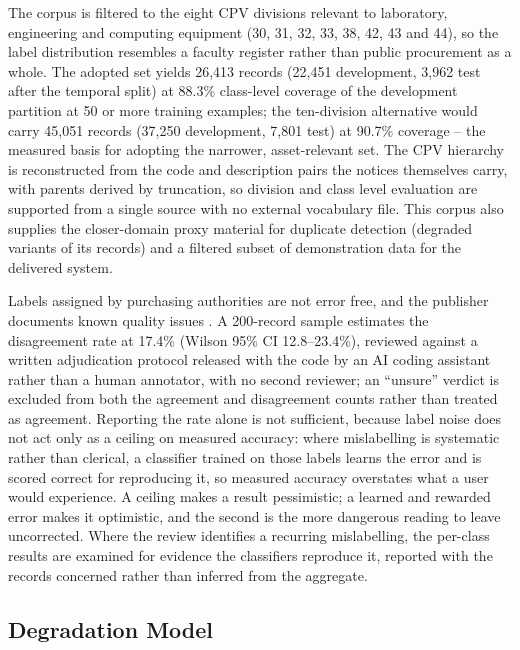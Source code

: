 \documentclass[conference]{IEEEtran}
\begin{document}
The corpus is filtered to the eight CPV divisions relevant to
laboratory, engineering and computing equipment (30, 31, 32, 33, 38,
42, 43 and 44), so the label distribution resembles a faculty register
rather than public procurement as a whole. The adopted set yields
26,413 records (22,451 development, 3,962 test after the temporal
split) at 88.3\% class-level coverage of the development partition at
50 or more training examples; the ten-division alternative would carry
45,051 records (37,250 development, 7,801 test) at 90.7\% coverage --
the measured basis for adopting the narrower, asset-relevant set. The
CPV hierarchy is reconstructed from the code and description pairs the
notices themselves carry, with parents derived by truncation, so
division and class level evaluation are supported from a single source
with no external vocabulary file. This corpus also supplies the
closer-domain proxy material for duplicate detection (degraded variants
of its records) and a filtered subset of demonstration data for the
delivered system.

Labels assigned by purchasing authorities are not error free, and the
publisher documents known quality issues \cite{contractsfinder}. A
200-record sample estimates the disagreement rate at 17.4\% (Wilson
95\% CI 12.8--23.4\%), reviewed against a written adjudication
protocol released with the code by an AI coding assistant rather than
a human annotator, with no second reviewer; an ``unsure'' verdict is
excluded from both the agreement and disagreement counts rather than
treated as agreement. Reporting the
rate alone is not sufficient, because label noise does not act only as
a ceiling on measured accuracy: where mislabelling is systematic rather
than clerical, a classifier trained on those labels learns the error
and is scored correct for reproducing it, so measured accuracy
overstates what a user would experience. A ceiling makes a result
pessimistic; a learned and rewarded error makes it optimistic, and the
second is the more dangerous reading to leave uncorrected. Where the
review identifies a recurring mislabelling, the per-class results are
examined for evidence the classifiers reproduce it, reported with the
records concerned rather than inferred from the aggregate.

\subsection{Degradation Model}
\end{document}
